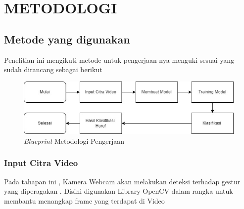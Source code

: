 \section{METODOLOGI}


\subsection{Metode yang digunakan}

Penelitian ini mengikuti metode untuk pengerjaan nya menguki sesuai yang sudah dirancang sebagai berikut

\begin{figure} [ht] \centering
  \includegraphics[scale=0.7]{gambar/Metodologi_TA.jpg}
  \caption{\emph{Blueprint} Metodologi Pengerjaan}
  \label{fig:Blueprint}
\end{figure}

\subsubsection{Input Citra Video}
Pada tahapan ini , Kamera Webcam akan melakukan deteksi terhadap gestur yang diperagakan . Disini digunakan Library OpenCV dalam rangka untuk membantu menangkap frame yang terdapat di Video 

